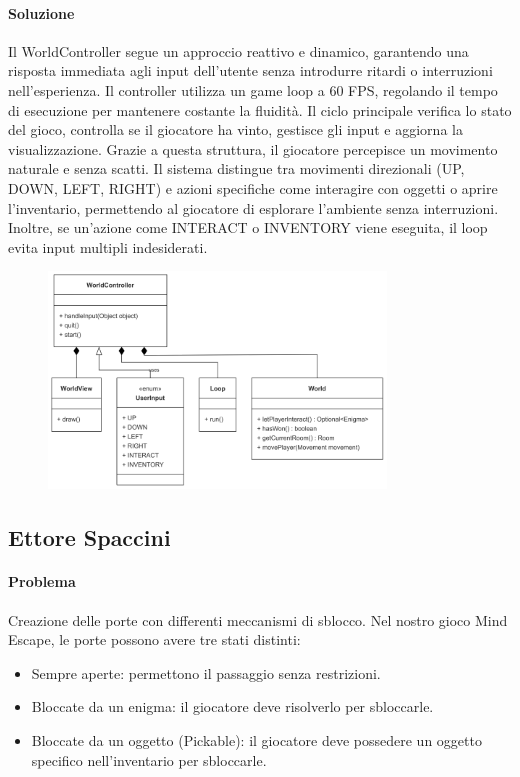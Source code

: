 \documentclass[a4paper,12pt]{report}
\begin{document}
\paragraph{Soluzione} Il WorldController segue un approccio reattivo e dinamico, garantendo una risposta immediata agli input dell’utente senza introdurre ritardi o interruzioni nell’esperienza.
Il controller utilizza un game loop a 60 FPS, regolando il tempo di esecuzione per mantenere costante la fluidità. Il ciclo principale verifica lo stato del gioco, controlla se il giocatore ha vinto, gestisce gli input e aggiorna la visualizzazione. Grazie a questa struttura, il giocatore percepisce un movimento naturale e senza scatti.
Il sistema distingue tra movimenti direzionali (UP, DOWN, LEFT, RIGHT) e azioni specifiche come interagire con oggetti o aprire l’inventario, permettendo al giocatore di esplorare l’ambiente senza interruzioni. Inoltre, se un’azione come INTERACT o INVENTORY viene eseguita, il loop evita input multipli indesiderati.
\begin{figure}[h]  %
    \centering
    \includegraphics[width=0.8\textwidth]{img/worldController.png}  %
    \label{img:controllerName}
\end{figure}
%
\subsection{Ettore Spaccini}
%
\paragraph{Problema} %
Creazione delle porte con differenti meccanismi di sblocco.
Nel nostro gioco Mind Escape, le porte possono avere tre stati distinti:
\begin{itemize}
	\item Sempre aperte: permettono il passaggio senza restrizioni.
	\item Bloccate da un enigma: il giocatore deve risolverlo per sbloccarle.
	\item Bloccate da un oggetto (Pickable): il giocatore deve possedere un oggetto specifico nell’inventario per sbloccarle.
\end{itemize}
\end{document}
